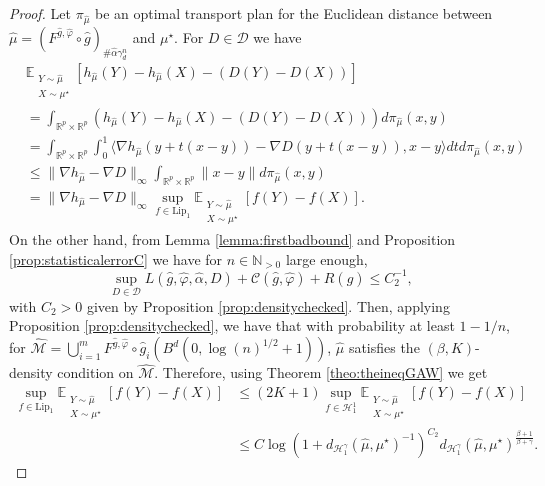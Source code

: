 \documentclass[10pt]{article}
\begin{document}
    
\begin{proof}
Let $\pi_{\hat{\mu}}$ be an optimal transport plan for the Euclidean distance between $\hat{\mu}=(F^{\hat{g},\hat{\varphi}}\circ \hat{g})_{\# \hat{\alpha}\gamma_d^n}$  and $\mu^\star$. For
$D \in \mathcal{D}$
we have
\begin{align*}
    &\mathbb{E}_{\substack{Y\sim \hat{\mu}\\
    X\sim \mu^\star}}[h_{\hat{\mu}}(Y)-h_{\hat{\mu}}(X)-(D(Y)-D(X))]\\
    & = \int_{\mathbb{R}^p\times \mathbb{R}^p} \left(h_{\hat{\mu}}(Y)-h_{\hat{\mu}}(X)-(D(Y)-D(X))\right)d\pi_{\hat{\mu}}(x,y)\\
    & = \int_{\mathbb{R}^p\times \mathbb{R}^p}  \int_0^1\Big\langle \nabla h_{\hat{\mu}}(y+t(x-y))-\nabla D(y+t(x-y)),x-y\Big\rangle dtd\pi_{\hat{\mu}}(x,y)\\
    & \leq \|\nabla h_{\hat{\mu}}-\nabla D\|_\infty \int_{\mathbb{R}^p\times \mathbb{R}^p}  \|x-y\| d\pi_{\hat{\mu}}(x,y)\\
    &  = \|\nabla h_{\hat{\mu}}-\nabla D\|_\infty \sup \limits_{f\in \text{Lip}_1}\mathbb{E}_{\substack{Y\sim \hat{\mu}\\
    X\sim \mu^\star}}[  f(Y)-f(X)].
\end{align*}
On the other hand, from Lemma \ref{lemma:firstbadbound} and Proposition \ref{prop:statisticalerrorC} we have for $n\in \mathbb{N}_{>0}$ large enough, 
\[
\sup_{D \in \mathcal{D}} L(\hat{g}, \hat{\varphi}, \hat{\alpha}, D) + \mathcal{C}(\hat{g}, \hat{\varphi}) + R(\hat{g}) \leq C_2^{-1},
\]
with $C_2>0$ given by Proposition \ref{prop:densitychecked}. Then, applying Proposition \ref{prop:densitychecked}, we have that with probability at least $1-1/n$, for  $\hat{\mathcal{M}}=\bigcup_{i=1}^m F^{\hat{g},\hat{\varphi}}\circ \hat{g}_{i}(B^d(0,\log(n)^{1/2}+1))$, $\hat{\mu}$  satisfies the $(\beta,K)$-density condition on $\hat{\mathcal{M}}$. Therefore, using Theorem \ref{theo:theineqGAW} we get
\begin{align*}
\sup \limits_{f\in \text{Lip}_1}\mathbb{E}_{\substack{Y\sim \hat{\mu}\\
    X\sim \mu^\star}}[  f(Y)-f(X)]
&\leq (2K+1)\sup \limits_{f\in \mathcal{H}^1_1}\mathbb{E}_{\substack{Y\sim \hat{\mu}\\
    X\sim \mu^\star}}[  f(Y)-f(X)]\\
& \leq C\log\left(1+d_{\mathcal{H}^{\gamma}_1}(\hat{\mu},\mu^\star)^{-1}\right)^{C_2} d_{\mathcal{H}^{\gamma}_1}(\hat{\mu},\mu^\star)^{\frac{\beta+1}{\beta+\gamma}}.
\end{align*}    
\end{proof}
\end{document}
